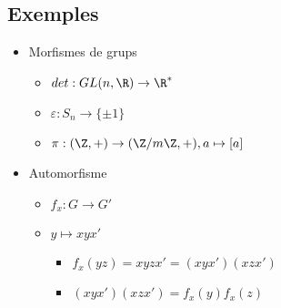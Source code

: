 \subsection*{Exemples}
\begin{itemize}
\item Morfismes de grups
	\begin{itemize}
	\item $det: GL(n, \R) \to \R^*$
	\item $\varepsilon: S_n \to \{\pm 1\}$
	\item $\pi: (\Z, +) \to (\Z/m\Z, +), a \mapsto [a]$
	\end{itemize}
\item Automorfisme
	\begin{itemize}
	\item $f_x:G\to G'$
	\item $y \mapsto xyx'$
		\begin{itemize}
		\item $f_x(yz) = xyzx' = (xyx')(xzx')$
		\item $(xyx')(xzx') = f_x(y)f_x(z)$
		\end{itemize}
	\end{itemize}
\end{itemize}
